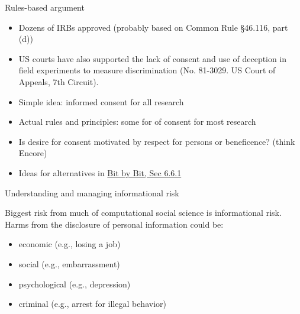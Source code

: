 \documentclass{beamer}
\begin{document}
\begin{frame}

Rules-based argument
\begin{itemize}
\item Dozens of IRBs approved (probably based on Common Rule §46.116, part (d))
\pause
\item US courts have also supported the lack of consent and use of deception in field experiments to measure discrimination (No. 81-3029.
US Court of Appeals, 7th Circuit).
\end{itemize}

\end{frame}
\begin{frame}

\begin{itemize}
\item Simple idea: informed consent for all research
\pause
\item Actual rules and principles: some for of consent for most research
\end{itemize}

\end{frame}
\begin{frame}

\begin{itemize}
\item Is desire for consent motivated by respect for persons or beneficence? (think Encore)
\pause
\item Ideas for alternatives in \href{https://www.bitbybitbook.com/en/1st-ed/preface/}{Bit by Bit, Sec 6.6.1}
\end{itemize}

\end{frame}
\begin{frame}

\begin{center}
\Large{Understanding and managing informational risk}
\end{center}

\end{frame}
\begin{frame}

Biggest risk from much of computational social science is informational risk.  Harms from the disclosure of personal information could be: 

\begin{itemize}
\item economic (e.g., losing a job)
\item social (e.g., embarrassment)
\item psychological (e.g., depression)
\item criminal (e.g., arrest for illegal behavior)
\end{itemize}

\end{frame}
\end{document}
